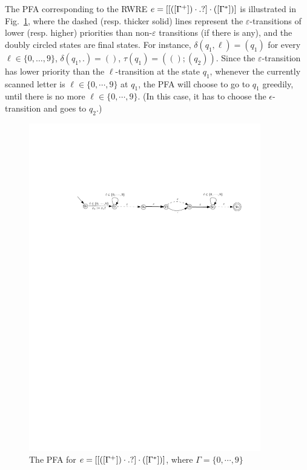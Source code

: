 \begin{example}\label{exmp-pfa}
	The PFA corresponding to the RWRE $e = [[([\Gamma^+])\cdot .?] \cdot ([\Gamma^*])]$ 
	is illustrated in Fig.~\ref{fig-pfa}, where the dashed (resp. thicker solid) lines represent the $\varepsilon$-transitions of lower (resp. higher) priorities than non-$\varepsilon$ transitions (if there is any), and the doubly circled states are final states. For instance, $\delta(q_1, \ell) = (q_1)$ for every $\ell \in \{0, \dots, 9\}$, $\delta(q_1, .) = ()$, $\tau(q_1) = ((); (q_2))$. Since the $\varepsilon$-transition has lower priority than the $\ell$-transition at the state $q_1$, whenever the currently scanned letter is $\ell \in \{0,\cdots,9\}$ at $q_1$,  the PFA will choose to go to $q_1$ greedily, until there is no more $\ell  \in \{0,\cdots,9\}$. (In this case, it has to choose the $\epsilon$-transition and goes to $q_2$.)
	\begin{figure}[ht]
		
		\centering
		\includegraphics[width=0.9\textwidth]{pfa-new.pdf}
		\caption{The PFA for $e = [[([\Gamma^+])\cdot .?] \cdot ([\Gamma^*])]$, where $\Gamma = \{0, \cdots, 9\}$}
		\label{fig-pfa}
		
	\end{figure}
\end{example}

